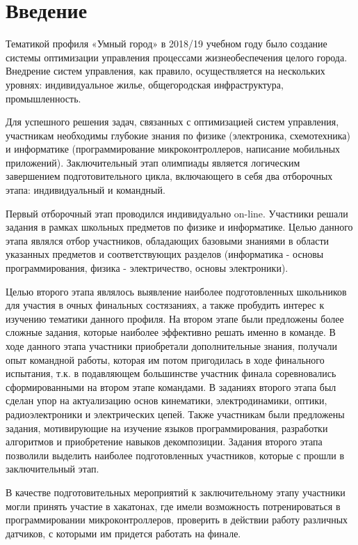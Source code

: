 %
\begingroup
\pagestyle{empty}
\section*{Введение}

Тематикой профиля «Умный город» в 2018/19 учебном году было создание системы оптимизации управления процессами жизнеобеспечения целого города. Внедрение систем управления, как правило, осуществляется на нескольких уровнях: индивидуальное жилье, общегородская инфраструктура, промышленность.

Для успешного решения задач, связанных с оптимизацией систем управления, участникам необходимы глубокие знания по физике (электроника, схемотехника) и информатике (программирование микроконтроллеров, написание мобильных приложений). Заключительный этап олимпиады является логическим завершением подготовительного цикла, включающего в себя два отборочных этапа: индивидуальный и командный.

Первый отборочный этап проводился индивидуально on-line. Участники решали задания в рамках школьных предметов по физике и информатике. Целью данного этапа являлся отбор участников, обладающих базовыми знаниями в области указанных предметов и соответствующих разделов (информатика - основы программирования, физика - электричество, основы электроники).

Целью второго этапа являлось выявление наиболее подготовленных школьников для участия в очных финальных состязаниях, а также пробудить интерес к изучению тематики данного профиля. На втором этапе были предложены более сложные задания, которые наиболее эффективно решать именно в команде. В ходе данного этапа участники приобретали дополнительные знания, получали опыт командной работы, которая им потом пригодилась в ходе финального испытания, т.к. в подавляющем большинстве участник финала соревновались  сформированными на втором этапе командами. В заданиях второго этапа был сделан упор на актуализацию основ кинематики, электродинамики, оптики, радиоэлектроники и электрических цепей.  Также участникам были предложены задания, мотивирующие на изучение языков программирования, разработки алгоритмов и приобретение навыков декомпозиции. Задания второго этапа позволили выделить наиболее подготовленных участников, которые с прошли в заключительный этап.

В качестве подготовительных мероприятий к заключительному этапу участники могли принять участие в хакатонах, где имели возможность потренироваться в программировании микроконтроллеров, проверить в действии работу различных датчиков, с которыми им придется работать на финале.

